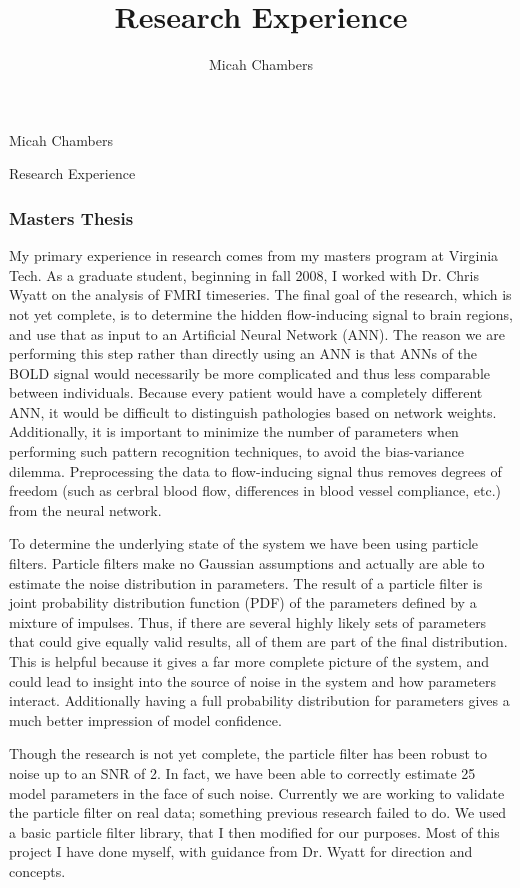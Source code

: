 \documentclass[12pt]{article}
\author{Micah Chambers}
\title{Research Experience}
\begin{document}
\Large
\begin{multicols}{2}
\begin{flushleft}
Micah Chambers
\end{flushleft}

\begin{flushright}
Research Experience
\end{flushright}
\end{multicols}
\normalsize

\subsubsection*{Masters Thesis}
My primary experience in research comes from my masters program at Virginia 
Tech. As a graduate student, beginning in fall 2008, I worked
with Dr. Chris Wyatt on the analysis of FMRI timeseries. The final goal
of the research, which is not yet complete, is to determine the hidden
flow-inducing signal to brain regions, and use
that as input to an Artificial Neural Network (ANN). The reason we are 
performing this step rather than directly using an ANN
is that ANNs of the BOLD signal would
necessarily be more complicated and thus less comparable between
individuals. Because every patient would have a completely
different ANN, it would be difficult to distinguish
pathologies based on network weights.
Additionally, it is important to minimize the number of
parameters when performing
such pattern recognition techniques, to avoid the bias-variance
dilemma. Preprocessing the data to flow-inducing signal thus
removes degrees  of freedom (such as cerbral blood flow, differences in 
blood vessel compliance, etc.) from the neural network.

To determine the underlying
state of the system we have been using particle filters.
Particle filters make no Gaussian assumptions and actually
are able to estimate the noise distribution in parameters. 
The result of a particle filter is joint 
probability distribution function (PDF) of the parameters
defined by a mixture of impulses. 
Thus, if there are several highly likely sets of parameters that could
give equally valid results, all of them are part of the final
distribution.  This is helpful because it gives a far more
complete picture of the system, and could lead to insight
into the source of noise in the system and how parameters interact. 
Additionally having a full probability
distribution for parameters gives a much better impression of
model confidence.

Though the research is not yet complete, the particle filter
has been robust to noise up to an SNR of 2. In fact, we have
been able to correctly estimate 25 model parameters in the face
of such noise. Currently we are working to
validate the particle filter on real data; something 
previous research failed to do. 
We used a basic particle filter library, that I then modified
for our purposes. Most of this project I have done myself,
with guidance from Dr. Wyatt for direction and concepts. 
\end{document}
